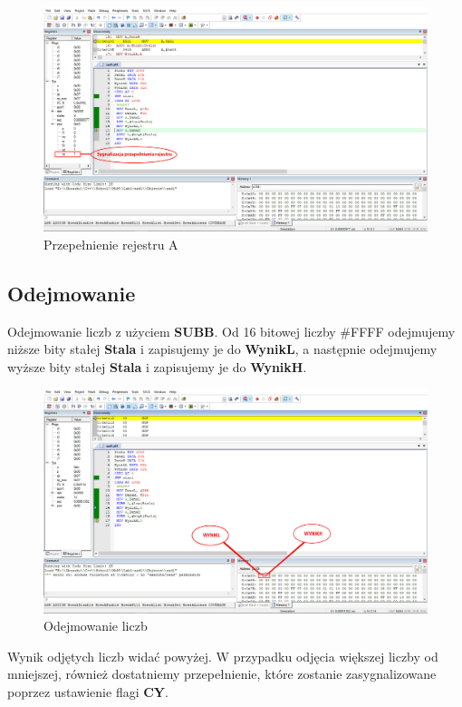 \documentclass{article}
\begin{document}
\begin{figure}[!htb]
  \includegraphics[width=\linewidth]{Fig3.jpg}
  \caption{Przepełnienie rejestru A}
  \label{fig:fig3}
\end{figure}

\newpage

\subsection{Odejmowanie}

Odejmowanie liczb z użyciem \textbf{SUBB}. Od 16 bitowej liczby \#FFFF odejmujemy niższe bity stałej \textbf{Stala} i zapisujemy je do \textbf{WynikL}, a następnie odejmujemy wyższe bity stałej \textbf{Stala} i zapisujemy je do \textbf{WynikH}.

\begin{figure}[!htb]
  \includegraphics[width=\linewidth]{Fig4.jpg}
  \caption{Odejmowanie liczb}
  \label{fig:fig4}
\end{figure}

Wynik odjętych liczb widać powyżej. W przypadku odjęcia większej liczby od mniejszej, również dostatniemy przepełnienie, które zostanie zasygnalizowane poprzez ustawienie flagi \textbf{CY}.
\end{document}
